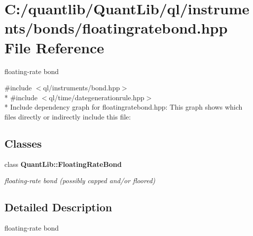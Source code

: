 \section{C\+:/quantlib/\+Quant\+Lib/ql/instruments/bonds/floatingratebond.hpp File Reference}
\label{floatingratebond_8hpp}


floating-\/rate bond  


{\ttfamily \#include $<$ql/instruments/bond.\+hpp$>$}\\*
{\ttfamily \#include $<$ql/time/dategenerationrule.\+hpp$>$}\\*
Include dependency graph for floatingratebond.\+hpp\+:
This graph shows which files directly or indirectly include this file\+:
\subsection*{Classes}
\begin{DoxyCompactItemize}
\item 
class {\bf Quant\+Lib\+::\+Floating\+Rate\+Bond}
\begin{DoxyCompactList}\small\item\em floating-\/rate bond (possibly capped and/or floored) \end{DoxyCompactList}\end{DoxyCompactItemize}


\subsection{Detailed Description}
floating-\/rate bond 

